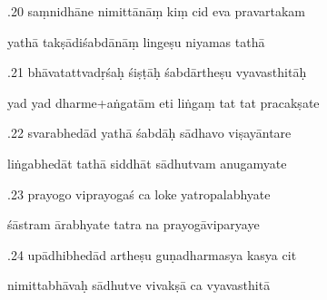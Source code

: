 \documentclass[article,12pt,a4paper]{memoir}%
\newcounter{parCount}
\begin{document}
	  
	  \pstart {}.20 saṃnidhāne nimittānāṃ kiṃ cid eva pravartakam 
	{}
	\pend%
      

	  
	  \pstart \leavevmode%
	yathā takṣādiśabdānāṃ lingeṣu niyamas tathā 
	{}
	\pend%
      

	  
	  \pstart {}.21 bhāvatattvadṛśaḥ śiṣṭāḥ śabdārtheṣu vyavasthitāḥ 
	{}
	\pend%
      

	  
	  \pstart \leavevmode%
	yad yad dharme+aṅgatām eti liṅgaṃ tat tat pracakṣate 
	{}
	\pend%
      

	  
	  \pstart {}.22 svarabhedād yathā śabdāḥ sādhavo viṣayāntare 
	{}
	\pend%
      

	  
	  \pstart \leavevmode%
	liṅgabhedāt tathā siddhāt sādhutvam anugamyate 
	{}
	\pend%
      

	  
	  \pstart {}.23 prayogo viprayogaś ca loke yatropalabhyate 
	{}
	\pend%
      

	  
	  \pstart \leavevmode%
	śāstram ārabhyate tatra na prayogāviparyaye 
	{}
	\pend%
      

	  
	  \pstart {}.24 upādhibhedād artheṣu guṇadharmasya kasya cit 
	{}
	\pend%
      

	  
	  \pstart \leavevmode%
	nimittabhāvaḥ sādhutve vivakṣā ca vyavasthitā 
	{}
	\pend%
      
\end{document}
